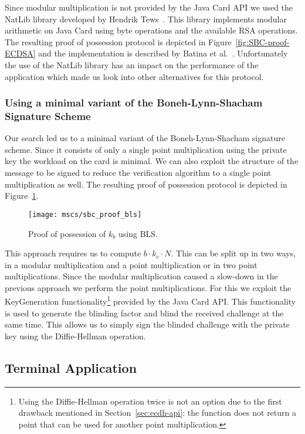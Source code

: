 Since modular multiplication is not provided by the Java Card API we used the
NatLib library developed by Hendrik Tews~\cite{TewsJacobs09}. This library
implements modular arithmetic on Java Card using byte operations and the
available RSA operations. The resulting proof of possession protocol is depicted
in Figure~\ref{fig:SBC-proof-ECDSA} and the implementation is described by
Batina et al.~\cite{BatinaHJMV10}. Unfortunately the use of the NatLib library
has an impact on the performance of the application which made us look into
other alternatives for this protocol.

\subsubsection{Using a minimal variant of the Boneh-Lynn-Shacham Signature Scheme}

Our search led us to a minimal variant of the Boneh-Lynn-Shacham signature
scheme. Since it consists of only a single point multiplication using the
private key the workload on the card is minimal. We can also exploit the
structure of the message to be signed to reduce the verification algorithm to a
single point multiplication as well. The resulting proof of possession protocol
is depicted in Figure~\ref{fig:SBC-proof-BLS}.

\begin{figure}[ht]
  \centering
  \texttt{[image: mscs/sbc\_proof\_bls]}
  \caption{Proof of possession of $k_b$ using BLS.}
  \label{fig:SBC-proof-BLS}
\end{figure}

This approach requires us to compute $b \cdot k_c \cdot N$. This can be split
up in two ways, in a modular multiplication and a point multiplication or in two
point multiplications. Since the modular multiplication caused a slow-down in
the previous approach we perform the point multiplications. For this we exploit
the KeyGeneration functionality\footnote{Using the Diffie-Hellman operation
twice is not an option due to the first drawback mentioned in
Section~\ref{sec:ecdh-api}: the function does not return a point that can be used
for another point multiplication.} provided by the Java Card API. This
functionality is used to generate the blinding factor and blind the received
challenge at the same time. This allows us to simply sign the blinded challenge
with the private key using the Diffie-Hellman operation.

\subsection{Terminal Application}

